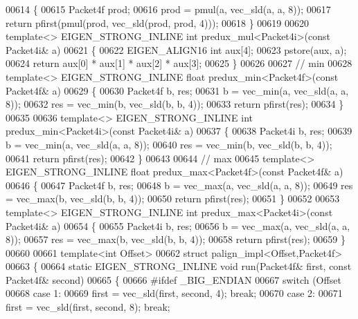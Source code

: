 \begin{DoxyCode}
{00614 \{
00615   Packet4f prod;
00616   prod = pmul(a, vec\_sld(a, a, 8));
00617   \textcolor{keywordflow}{return} pfirst(pmul(prod, vec\_sld(prod, prod, 4)));
00618 \}
00619 
00620 \textcolor{keyword}{template}<> EIGEN\_STRONG\_INLINE \textcolor{keywordtype}{int} predux\_mul<Packet4i>(\textcolor{keyword}{const} Packet4i& a)
00621 \{
00622   EIGEN\_ALIGN16 \textcolor{keywordtype}{int} aux[4];
00623   pstore(aux, a);
00624   \textcolor{keywordflow}{return} aux[0] * aux[1] * aux[2] * aux[3];
00625 \}
00626 
00627 \textcolor{comment}{// min}
00628 \textcolor{keyword}{template}<> EIGEN\_STRONG\_INLINE \textcolor{keywordtype}{float} predux\_min<Packet4f>(\textcolor{keyword}{const} Packet4f& a)
00629 \{
00630   Packet4f b, res;
00631   b = vec\_min(a, vec\_sld(a, a, 8));
00632   res = vec\_min(b, vec\_sld(b, b, 4));
00633   \textcolor{keywordflow}{return} pfirst(res);
00634 \}
00635 
00636 \textcolor{keyword}{template}<> EIGEN\_STRONG\_INLINE \textcolor{keywordtype}{int} predux\_min<Packet4i>(\textcolor{keyword}{const} Packet4i& a)
00637 \{
00638   Packet4i b, res;
00639   b = vec\_min(a, vec\_sld(a, a, 8));
00640   res = vec\_min(b, vec\_sld(b, b, 4));
00641   \textcolor{keywordflow}{return} pfirst(res);
00642 \}
00643 
00644 \textcolor{comment}{// max}
00645 \textcolor{keyword}{template}<> EIGEN\_STRONG\_INLINE \textcolor{keywordtype}{float} predux\_max<Packet4f>(\textcolor{keyword}{const} Packet4f& a)
00646 \{
00647   Packet4f b, res;
00648   b = vec\_max(a, vec\_sld(a, a, 8));
00649   res = vec\_max(b, vec\_sld(b, b, 4));
00650   \textcolor{keywordflow}{return} pfirst(res);
00651 \}
00652 
00653 \textcolor{keyword}{template}<> EIGEN\_STRONG\_INLINE \textcolor{keywordtype}{int} predux\_max<Packet4i>(\textcolor{keyword}{const} Packet4i& a)
00654 \{
00655   Packet4i b, res;
00656   b = vec\_max(a, vec\_sld(a, a, 8));
00657   res = vec\_max(b, vec\_sld(b, b, 4));
00658   \textcolor{keywordflow}{return} pfirst(res);
00659 \}
00660 
00661 \textcolor{keyword}{template}<\textcolor{keywordtype}{int} Offset>
00662 \textcolor{keyword}{struct }palign\_impl<Offset,Packet4f>
00663 \{
00664   \textcolor{keyword}{static} EIGEN\_STRONG\_INLINE \textcolor{keywordtype}{void} run(Packet4f& first, \textcolor{keyword}{const} Packet4f& second)
00665   \{
00666 \textcolor{preprocessor}{#ifdef \_BIG\_ENDIAN}
00667     \textcolor{keywordflow}{switch} (Offset %
00668     \textcolor{keywordflow}{case} 1:
00669       first = vec\_sld(first, second, 4); \textcolor{keywordflow}{break};
00670     \textcolor{keywordflow}{case} 2:
00671       first = vec\_sld(first, second, 8); \textcolor{keywordflow}{break};
}
\end{DoxyCode}

